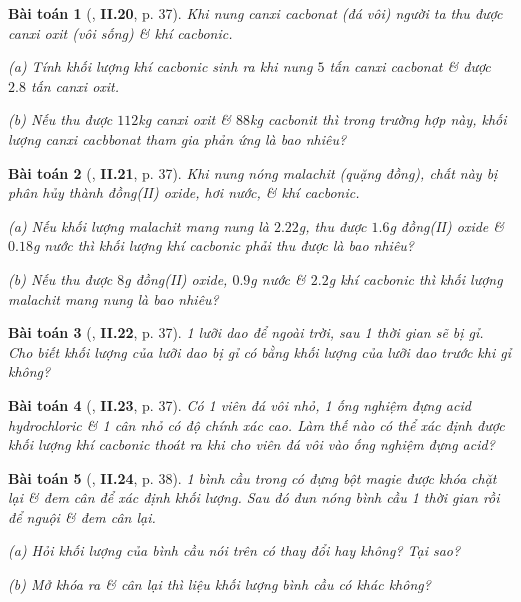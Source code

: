 \documentclass{article}
\numberwithin{equation}{section}
\newtheorem{baitoan}{Bài toán}
\begin{document}
\begin{baitoan}[\cite{Truong_BTNC_Hoa_Hoc_8_2022}, \textbf{II.20}, p. 37]
	Khi nung canxi cacbonat (đá vôi) người ta thu được canxi oxit (vôi sống) \& khí cacbonic.
	\begin{enumerate*}
		\item[(a)] Tính khối lượng khí cacbonic sinh ra khi nung $5$ tấn canxi cacbonat \& được $2.8$ tấn canxi oxit.
		\item[(b)] Nếu thu được $112$\emph{kg} canxi oxit \& $88$\emph{kg} cacbonit thì trong trường hợp này, khối lượng canxi cacbbonat tham gia phản ứng là bao nhiêu?
	\end{enumerate*}
\end{baitoan}

\begin{baitoan}[\cite{Truong_BTNC_Hoa_Hoc_8_2022}, \textbf{II.21}, p. 37]
	Khi nung nóng malachit (quặng đồng), chất này bị phân hủy thành đồng(II) oxide, hơi nước, \& khí cacbonic.
	\begin{enumerate*}
		\item[(a)] Nếu khối lượng malachit  mang nung là $2.22$\emph{g}, thu được $1.6$\emph{g} đồng(II) oxide \& $0.18$\emph{g} nước thì khối lượng khí cacbonic phải thu được là bao nhiêu?
		\item[(b)] Nếu thu được $8$\emph{g} đồng(II) oxide, $0.9$\emph{g} nước \& $2.2$\emph{g} khí cacbonic thì khối lượng malachit mang nung là bao nhiêu?
	\end{enumerate*}
\end{baitoan}

\begin{baitoan}[\cite{Truong_BTNC_Hoa_Hoc_8_2022}, \textbf{II.22}, p. 37]
	1 lưỡi dao để ngoài trời, sau 1 thời gian sẽ bị gỉ. Cho biết khối lượng của lưỡi dao bị gỉ có bằng khối lượng của lưỡi dao trước khi gỉ không?
\end{baitoan}

\begin{baitoan}[\cite{Truong_BTNC_Hoa_Hoc_8_2022}, \textbf{II.23}, p. 37]
	Có 1 viên đá vôi nhỏ, 1 ống nghiệm đựng acid hydrochloric \& 1 cân nhỏ có độ chính xác cao. Làm thế nào có thể xác định được khối lượng khí cacbonic thoát ra khi cho viên đá vôi vào ống nghiệm đựng acid?
\end{baitoan}

\begin{baitoan}[\cite{Truong_BTNC_Hoa_Hoc_8_2022}, \textbf{II.24}, p. 38]
	1 bình cầu trong có đựng bột magie được khóa chặt lại \& đem cân để xác định khối lượng. Sau đó đun nóng bình cầu 1 thời gian rồi để nguội \& đem cân lại.
	\begin{enumerate*}
		\item[(a)] Hỏi khối lượng của bình cầu nói trên có thay đổi hay không? Tại sao?
		\item[(b)] Mở khóa ra \& cân lại thì liệu khối lượng bình cầu có khác không?
	\end{enumerate*}
\end{baitoan}
\end{document}
